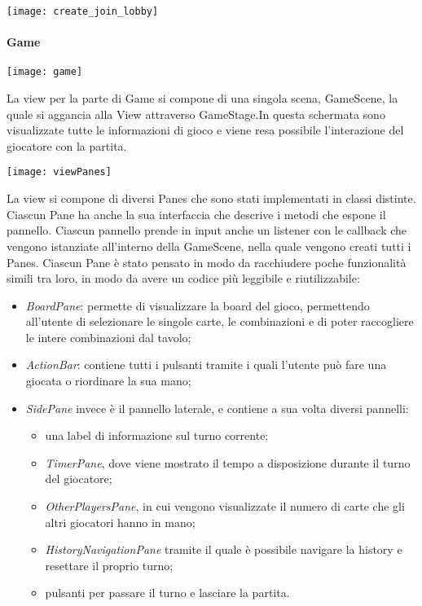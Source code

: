\begin{center}
    \texttt{[image: create\_join\_lobby]}
\end{center}

\paragraph{Game}
\begin{center}
    \texttt{[image: game]}
\end{center}
La view per la parte di Game si compone di una singola scena, GameScene, la quale si aggancia alla View attraverso GameStage.In questa schermata sono visualizzate tutte le informazioni di gioco e viene resa possibile l’interazione del giocatore con la partita. \newline
\begin{center}
    \texttt{[image: viewPanes]}
\end{center}
La view si compone di diversi Panes che sono stati implementati in classi distinte. Ciascun Pane ha anche la sua interfaccia che descrive i metodi che espone il pannello.
Ciascun pannello prende in input anche un listener con le callback che vengono istanziate all’interno della GameScene, nella quale vengono creati tutti i Panes.
\newline \newline
Ciascun Pane è stato pensato in modo da racchiudere poche funzionalità simili tra loro, in modo da avere un codice più leggibile e riutilizzabile:
\begin{itemize}
    \item \textit{BoardPane}: permette di visualizzare la board del gioco, permettendo all’utente di selezionare le singole carte, le combinazioni e di poter raccogliere le intere combinazioni dal tavolo;
    \item \textit{ActionBar}: contiene tutti i pulsanti tramite i quali l’utente può fare una giocata o riordinare la sua mano;
    \item \textit{SidePane} invece è il pannello laterale, e contiene a sua volta diversi pannelli:
    \begin{itemize}
        \item una label di informazione sul turno corrente;
        \item \textit{TimerPane}, dove viene mostrato il tempo a disposizione durante il turno del giocatore;
        \item \textit{OtherPlayersPane}, in cui vengono visualizzate il numero di carte che gli altri giocatori hanno in mano;
        \item \textit{HistoryNavigationPane} tramite il quale è possibile navigare la history e resettare il proprio turno;
        \item pulsanti per passare il turno e lasciare la partita.
    \end{itemize}
\end{itemize}
